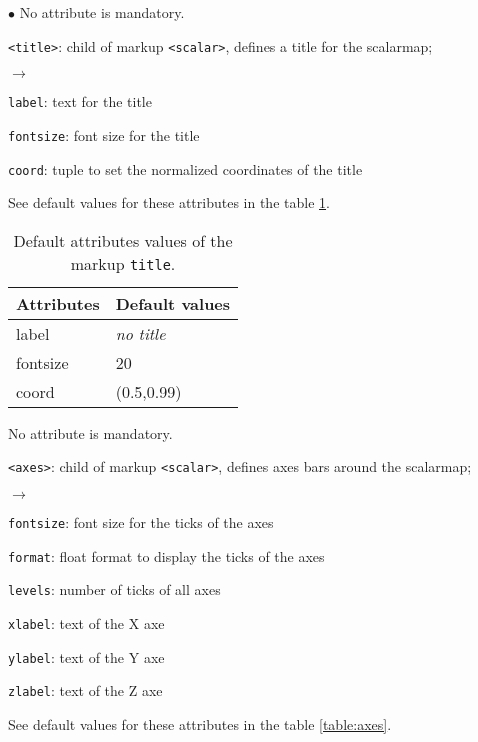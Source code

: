 \documentclass[a4paper,10pt,twoside]{csshortdoc}
\begin{document}
\begin{list}{$\bullet$}{}
No attribute is mandatory.

\item \texttt{<title>}: child of markup \texttt{<scalar>}, defines a title for the scalarmap;
\begin{list}{$\rightarrow$}{}
\item \texttt{label}: text for the title
\item \texttt{fontsize}: font size for the title
\item \texttt{coord}: tuple to set the normalized coordinates of the title
\end{list}

See default values for these attributes in the table \ref{table:title}.

\begin{table}[htbp]
\begin{center}
\begin{tabular}{|l|l|}
\hline
\textbf{Attributes} & \textbf{Default values} \\
\hline
label & \textit{no title} \\
fontsize & 20 \\
coord & (0.5,0.99) \\
\hline
\end{tabular}
\end{center}
\caption{Default attributes values of the markup \texttt{title}.}
\label{table:title}
\end{table}

No attribute is mandatory.

\item \texttt{<axes>}:  child of markup \texttt{<scalar>}, defines axes bars around the scalarmap;
\begin{list}{$\rightarrow$}{}
\item \texttt{fontsize}: font size for the ticks of the axes
\item \texttt{format}: float format to display the ticks of the axes
\item \texttt{levels}: number of ticks of all axes
\item \texttt{xlabel}: text of the X axe
\item \texttt{ylabel}: text of the Y axe
\item \texttt{zlabel}: text of the Z axe
\end{list}

See default values for these attributes in the table \ref{table:axes}.


\end{list}
\end{document}
